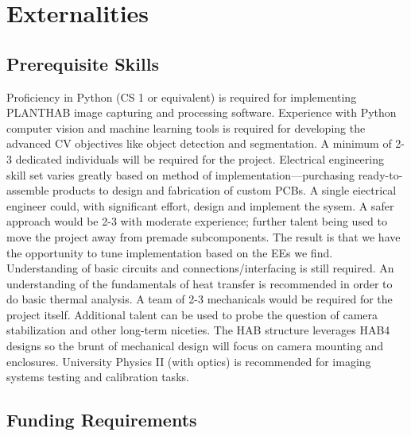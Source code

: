 \documentclass[conference]{IEEEtran} %
\begin{document}
\section{Externalities}
\subsection{Prerequisite Skills}
Proficiency in Python (CS 1 or equivalent) is required for implementing PLANTHAB image capturing and processing software.
Experience with Python computer vision and machine learning tools is required for developing the advanced CV objectives like object detection and segmentation. A minimum of 2-3 dedicated individuals will be required for the project.
Electrical engineering skill set varies greatly based on method of implementation---purchasing ready-to-assemble products to design and fabrication of custom PCBs. A single eiectrical engineer could, with significant effort, design and implement the sysem. A safer approach would be 2-3 with moderate experience; further talent being used to move the project away from premade subcomponents.
The result is that we have the opportunity to tune implementation based on the EEs we find.
Understanding of basic circuits and connections/interfacing is still required.
An understanding of the fundamentals of heat transfer is recommended in order to do basic thermal analysis. A team of 2-3 mechanicals would be required for the project itself. Additional talent can be used to probe the question of camera stabilization and other long-term niceties.
The HAB structure leverages HAB4 designs so the brunt of mechanical design will focus on camera mounting and enclosures.
University Physics II (with optics) is recommended for imaging systems testing and calibration tasks.

\subsection{Funding Requirements}
\label{funding}

\end{document}
